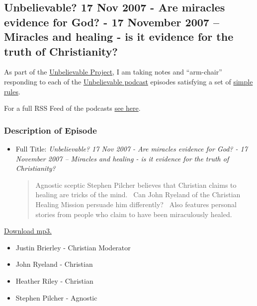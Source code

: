 \documentclass{tufte-book}
\begin{document}

\subsection{Unbelievable? 17 Nov 2007 - Are miracles evidence for God? -
17 November 2007 -- Miracles and healing - is it evidence for the truth
of
Christianity?}\label{unbelievable-17-nov-2007-are-miracles-evidence-for-god-17-november-2007-miracles-and-healing-is-it-evidence-for-the-truth-of-christianity}

As part of the
\href{https://brianblais.wordpress.com/2013/02/27/unbelievable-project-a-non-believers-armchair-perspective-on-six-years-of-christian-debates/}{Unbelievable
Project}, I am taking notes and ``arm-chair'' responding to each of the
\href{http://www.premierradio.org.uk/shows/saturday/unbelievable.aspx}{Unbelievable
podcast} episodes satisfying a set of
\href{https://brianblais.wordpress.com/2013/02/27/unbelievable-project-a-non-believers-armchair-perspective-on-six-years-of-christian-debates/}{simple
rules}.

For a full RSS Feed of the podcasts
\href{http://ondemand.premier.org.uk/unbelievable/AudioFeed.aspx}{see
here}.

\subsubsection{Description of Episode}\label{description-of-episode}

\begin{itemize}
\item
  Full Title: \emph{Unbelievable? 17 Nov 2007 - Are miracles evidence
  for God? - 17 November 2007 -- Miracles and healing - is it evidence
  for the truth of Christianity?}

  \begin{quote}
  Agnostic sceptic Stephen Pilcher believes that Christian claims to
  healing are tricks of the mind.~ Can John Ryeland of the Christian
  Healing Mission persuade him differently?~ Also features personal
  stories from people who claim to have been miraculously healed.
  \end{quote}
\end{itemize}

\href{http://media.premier.org.uk/unbelievable/ba5b6360-edf3-4218-8878-3292237289f5.mp3}{Download
mp3.}

\begin{itemize}
\itemsep1pt\parskip0pt
\item
  Justin Brierley - Christian Moderator
\item
  John Ryeland - Christian
\item
  Heather Riley - Christian
\item
  Stephen Pilcher - Agnostic
\end{itemize}
\end{document}
